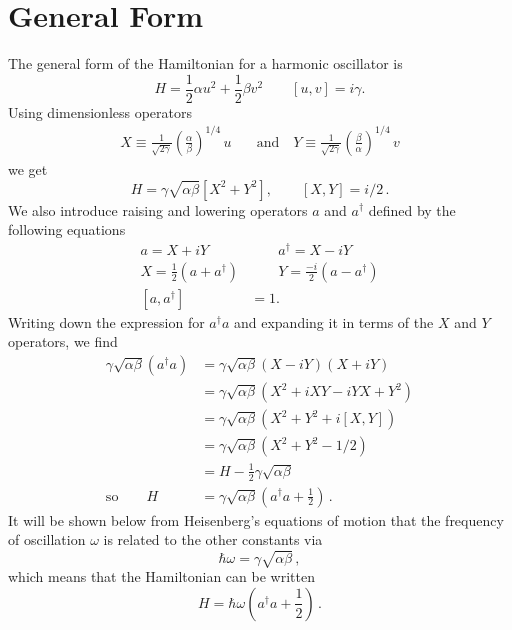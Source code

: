 \section{General Form}

The general form of the Hamiltonian for a harmonic oscillator is \begin{equation}
H = \frac{1}{2} \alpha u^2 + \frac{1}{2} \beta v^2 \qquad [u,v]= i \gamma . \end{equation}
Using dimensionless operators
\begin{align}
X \equiv \frac{1}{\sqrt{2 \gamma}} \left( \frac{\alpha}{\beta}\right)^{1/4}\,u
&\quad \textrm{and} \quad
Y \equiv \frac{1}{\sqrt{2 \gamma}} \left( \frac{\beta}{\alpha} \right)^{1/4}\,v 
\end{align}
we get
\begin{equation}
H = \gamma \sqrt{\alpha \beta} \left[ X^{2} + Y^{2} \right],
\qquad
[X,Y] = i/2 \, .
\end{equation}
We also introduce raising and lowering operators $a$ and $a^{\dagger}$ defined by the following equations \begin{align}
a = X+iY &\qquad a^{\dagger} = X-iY \nonumber \\
X = \frac{1}{2}\left(a+a^{\dagger}\right) &\qquad Y = \frac{-i}{2}\left(a-a^{\dagger}\right) \\
[ a, a^{\dagger} ] &= 1 . \end{align}
Writing down the expression for $a^{\dagger}a$ and expanding it in terms of the $X$ and $Y$ operators, we find \begin{align*}
\gamma \sqrt{\alpha \beta} ( a^{\dagger} a ) & = \gamma\sqrt{\alpha\beta} (X-iY)(X+iY)\\
 & = \gamma\sqrt{\alpha\beta} \left(X^2 + iXY - iYX + Y^2 \right)\\
 & = \gamma\sqrt{\alpha\beta} \left(X^2 + Y^{2} + i \left[ X,Y \right] \right)\\
 & = \gamma\sqrt{\alpha\beta} \left(X^2 + Y^{2} - 1/2 \right)\\
 & = H - \frac{1}{2}\gamma\sqrt{\alpha\beta} \\
\textrm{so}\qquad H & = \gamma\sqrt{\alpha\beta} \left( a^{\dagger}a + \frac{1}{2} \right) \, .
\end{align*}
It will be shown below from Heisenberg's equations of motion that the frequency of oscillation $\omega$ is related to the other constants via
\begin{equation}
\hbar\omega=\gamma\sqrt{\alpha\beta} \, ,
\end{equation}
which means that the Hamiltonian can be written
\begin{equation}
H=\hbar\omega\left(a^{\dagger}a+\frac{1}{2}\right) \, .
\end{equation}

